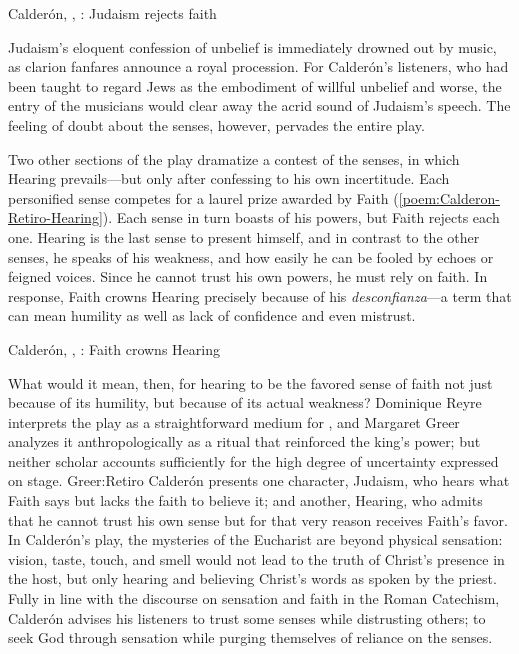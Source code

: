 \begin{poemexample}
    \caption{Calderón, , :
    Judaism rejects faith}
    
    \label{poem:Calderon-Retiro-Judaismo}
\end{poemexample}

Judaism's eloquent confession of unbelief is immediately drowned out by music,
as clarion fanfares announce a royal procession.
For Calderón's listeners, who had been taught to regard Jews as the embodiment
of willful unbelief and worse, the entry of the musicians would clear away the
acrid sound of Judaism's speech.
The feeling of doubt about the senses, however, pervades the entire play.

Two other sections of the play dramatize a contest of the senses, in which
Hearing prevails---but only after confessing to his own incertitude.
Each personified sense competes for a laurel prize awarded by Faith
(\cref{poem:Calderon-Retiro-Hearing}).
Each sense in turn boasts of his powers, but Faith rejects each one.
Hearing is the last sense to present himself, and in contrast to the other
senses, he speaks of his weakness, and how easily he can be fooled by echoes or
feigned voices.
Since he cannot trust his own powers, he must rely on faith.
In response, Faith crowns Hearing precisely because of his
\emph{desconfianza}---a term that can mean humility as well as lack of
confidence and even mistrust.

\begin{poemexample}
    \caption{Calderón, , : Faith
    crowns Hearing}

    \label{poem:Calderon-Retiro-Hearing}
\end{poemexample}

What would it mean, then, for hearing to be the favored sense of faith not just
because of its humility, but because of its actual weakness?
Dominique Reyre interprets the play as a straightforward medium for
, and Margaret Greer analyzes it anthropologically
as a ritual that reinforced the king's power; but neither scholar accounts
sufficiently for the high degree of uncertainty expressed on stage.%
    \Autocite{Reyre:Retiro}{Greer:Retiro}
Calderón presents one character, Judaism, who hears what Faith says but lacks
the faith to believe it; and another, Hearing, who admits that he cannot trust
his own sense but for that very reason receives Faith's favor.
In Calderón's play, the mysteries of the Eucharist are beyond physical
sensation: vision,
taste, touch, and smell would not lead to the truth of Christ's presence in the
host, but only hearing and believing Christ's words  as
spoken by the priest.
Fully in line with the discourse on sensation and faith in the Roman Catechism,
Calderón advises his listeners to trust some senses while distrusting others; to
seek God through sensation while purging themselves of reliance on the senses.

